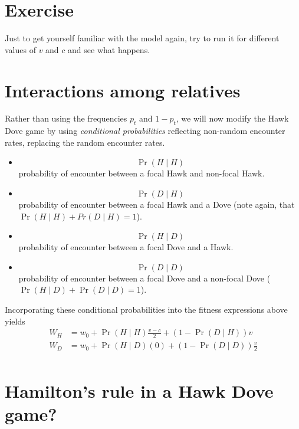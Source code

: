 \documentclass[
]{book}
\providecommand{\tightlist}{%
  \setlength{\itemsep}{0pt}\setlength{\parskip}{0pt}}
\begin{document}
\hypertarget{exercise-6}{%
\section{Exercise}\label{exercise-6}}

Just to get yourself familiar with the model again, try to run it for different values of \(v\) and \(c\) and see what happens.

\hypertarget{interactions-among-relatives}{%
\section{Interactions among relatives}\label{interactions-among-relatives}}

Rather than using the frequencies \(p_{t}\) and \(1-p_{t}\), we will now modify the Hawk Dove game by using \emph{conditional probabilities} reflecting non-random encounter rates, replacing the random encounter rates.

\begin{itemize}
\tightlist
\item
  \[ \Pr(H \mid H)\] probability of encounter between a focal Hawk and non-focal Hawk.
\item
  \[ \Pr(D \mid H)\] probability of encounter between a focal Hawk and a Dove (note again, that \(\Pr(H \mid H) + Pr(D \mid H) = 1\)).
\item
  \[ \Pr(H \mid D)\] probability of encounter between a focal Dove and a Hawk.
\item
  \[ \Pr(D \mid D)\] probability of encounter between a focal Dove and a non-focal Dove (\(\Pr(H \mid D) + \Pr(D \mid D) = 1\)).
\end{itemize}

Incorporating these conditional probabilities into the fitness expressions above yields
\begin{align}
W_{H} &= w_{0} + \Pr(H\mid H) \frac{v-c}{2} + \left(1 - \Pr (D \mid H ) \right) v \label{eq:wH} \\
W_{D} &= w_{0} + \Pr (H \mid D) (0) + \left(1 - \Pr ( D \mid D ) \right) \frac{v}{2} \label{eq:wD}\\
\end{align}

\hypertarget{hamiltons-rule-in-a-hawk-dove-game}{%
\section{Hamilton's rule in a Hawk Dove game?}\label{hamiltons-rule-in-a-hawk-dove-game}}
\end{document}

